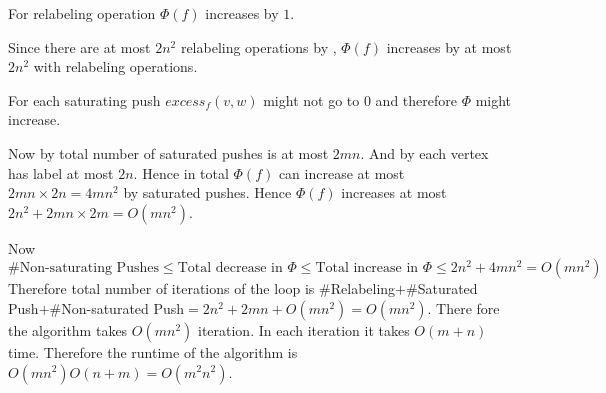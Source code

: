 \begin{observation}
	For relabeling operation $\Phi(f)$ increases by $1$.
\end{observation}
Since there are at most $2n^2$ relabeling operations by  , $\Phi(f)$ increases by at most $2n^2$ with relabeling operations.
\begin{observation}
	For each saturating push $\textit{excess}_f(v,w)$ might not go to $0$ and therefore $\Phi$ might increase.
\end{observation}
Now by  total number of saturated pushes is at most $2mn$. And by  each vertex has label at most $2n$. Hence in total $\Phi(f)$ can increase at most $2mn\times 2n=4mn^2$ by saturated pushes. Hence $\Phi(f)$ increases at most $2n^2+2mn\times 2m=O(mn^2)$.


Now $$\#\text{Non-saturating Pushes}  \leq \text{Total decrease in }\Phi\leq \text{Total increase in }\Phi\leq 2n^2+4mn^2=O(mn^2)$$
Therefore total number of iterations of the  loop is $\#$Relabeling$+\#$Saturated Push$+\#$Non-saturated Push$= 2n^2+2mn+O(mn^2)=O(mn^2)$.  There fore the algorithm takes $O(mn^2)$ iteration. In each iteration it takes $O(m+n)$ time. Therefore the runtime of the algorithm is $O(mn^2)O(n+m)=O(m^2n^2)$.